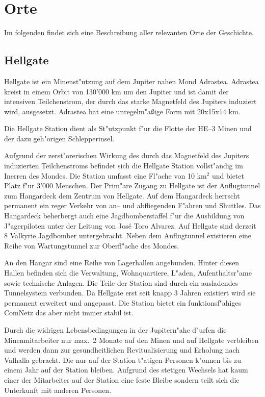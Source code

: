 \chapter{Orte}

Im folgenden findet sich eine Beschreibung aller relevanten Orte der Geschichte.

\section{Hellgate}

Hellgate ist ein Minenst"utzung auf dem Jupiter nahen Mond Adrastea. Adrastea kreist in einem Orbit von 130'000 km um den Jupiter und
ist damit der intensiven Teilchenstrom, der durch das starke Magnetfeld des Jupiters induziert wird, ausgesetzt. Adrastea hat eine unregelm"aßige Form mit 20x15x14 km.

Die Hellgate Station dient als St"utzpunkt f"ur die Flotte der HE--3 Minen und der dazu geh"origen Schlepperinsel. 

Aufgrund der zerst"orerischen Wirkung des durch das Magnetfeld des Jupiters induzierten Teilchenstroms befindet sich die Hellgate Station vollst"andig im Inerren des Mondes. Die Station umfasst eine Fl"ache von 10 km$^{2}$ und bietet Platz f"ur 3'000 Menschen. Der Prim"are Zugang zu Hellgate ist der Anflugtunnel zum Hangardeck dem Zentrum von Hellgate. Auf dem Hangardeck herrscht permanent ein reger Verkehr von an-- und abfliegenden F"ahren und Shuttles. Das Hangardeck beherbergt auch eine Jagdbomberstaffel f"ur die Ausbildung von J"agerpiloten unter der Leitung von Jos\'{e} \frqq{}Toro\flqq{} Alvarez. Auf Hellgate sind derzeit 8 Valkyrie Jagdbomber untergebracht. Neben dem Anflugtunnel existieren eine Reihe von Wartungstunnel zur Oberfl"ache des Mondes.

An den Hangar sind eine Reihe von Lagerhallen angebunden. Hinter diesen Hallen befinden sich die Verwaltung, Wohnquartiere, L"aden, Aufenthaltsr"ame sowie technische Anlagen. Die Teile der Station sind durch ein ausladendes Tunnelsystem verbunden. Da Hellgate erst seit knapp 3 Jahren existiert wird sie permanent erweitert und angepasst. Die Station bietet ein funktionsf"ahiges ComNetz das aber nicht immer stabil ist.

Durch die widrigen Lebensbedingungen in der Jupitern"ahe d"urfen die Minenmitarbeiter nur max.~2 Monate auf den Minen und auf Hellgate verbleiben und werden dann zur gesundheitlichen Revitualisierung und Erholung nach Valhalla gebracht. Die nur auf der Station t"atigen Personen k"onnen bis zu einem Jahr auf der Station bleiben. Aufgrund des stetigen Wechsels hat kaum einer der Mitarbeiter auf der Station eine feste Bleibe sondern teilt sich die Unterkunft mit anderen Personen.

